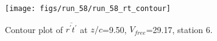 \begin{figure}[H]
\centering
\texttt{[image: figs/run\_58/run\_58\_rt\_contour]}
\caption{Contour plot of $\overline{r^\prime t^\prime}$ at $z/c$=9.50, $V_{free}$=29.17, station 6.}
\label{fig:run_58_rt_contour}
\end{figure}



